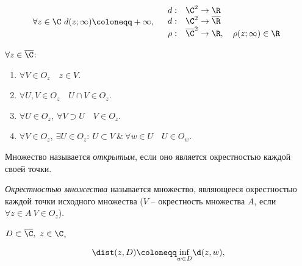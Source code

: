 

\[
	\forall z \in \C \ d(z ; \infty )\coloneqq +\infty, \quad \begin{array}{ll}
		d:    & \C^2 \rightarrow \R                                            \\
		d:    & \C^2 \rightarrow \overline{\R}                                 \\
		\rho: & \overline{\C}^2 \rightarrow \R, \quad \rho(z ; \infty ) \in \R
	\end{array}
\]

\begin{property}
	$\forall z \in \overline{\C}$:
	\begin{enumerate}
		\item $\forall V \in O_z \quad z \in V$.
		\item $\forall U,V \in O_z \quad U \cap V \in O_z$.
		\item $\forall U \in O_z, \ \forall V \supset U \quad V \in O_z$.
		\item $\forall V \in O_z, \ \exists U \in O_z : \ U \subset V \ \& \ \forall w \in U \quad U \in O_w$.
	\end{enumerate}
\end{property}

\begin{definition}
	Множество называется \emph{открытым}, если оно является окрестностью каждой своей точки.
\end{definition}

\begin{definition}
	\emph{Окрестностью множества} называется множество, являющееся окрестностью каждой точки исходного множества ($V$ -- окрестность множества $A$, если $\forall z \in A \ V \in O_z$).
\end{definition}

\begin{definition}
	$D \subset \overline{\C}, \ z \in \C$,
	\begin{multicols}{2}
		\[
			\dist(z,D)\coloneqq \underset{w \in D}{\inf}\d(z,w),
		\]

		\columnbreak

		\begin{figure}[H]
			\centering
			\label{fig:fig-4}
		\end{figure}
	\end{multicols}
\end{definition}

